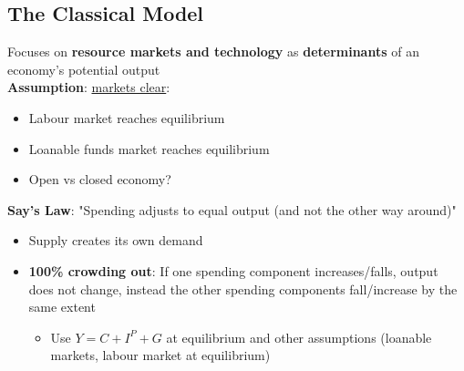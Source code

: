 \documentclass{article}
\begin{document}
\begin{multicols}{2}
\subsection{The Classical Model}
Focuses on \textbf{resource markets and technology} as \textbf{determinants} of an economy's potential output
\vspace{0.5em}\\
\textbf{Assumption}: \underline{markets clear}:
\begin{itemize}
	\item Labour market reaches equilibrium
	\item Loanable funds market reaches equilibrium
	\item Open vs closed economy?
\end{itemize}
\vspace{0.5em}
\textbf{Say's Law}: "Spending adjusts to equal output (and not the other way around)"
\begin{itemize}
	\item Supply creates its own demand
	\item \textbf{100\% crowding out}: If one spending component increases/falls, output does not change, instead the other spending components fall/increase by the same extent
	\begin{itemize}
		\item Use $Y = C + I^P + G$ at equilibrium and other assumptions (loanable markets, labour market at equilibrium)
	\end{itemize}
\end{itemize}


\end{multicols}
\end{document}
